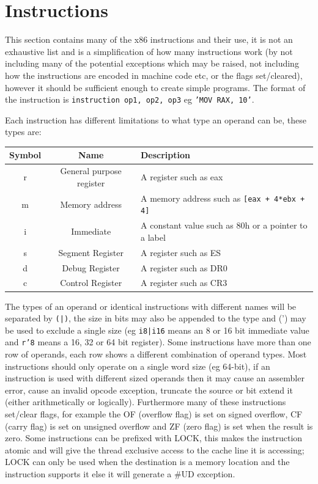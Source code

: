 \documentclass{article}
\newcommand{\layout}[1]{\parbox{\linewidth}{#1}}
\begin{document}
\layout{
  \section{Instructions}

  This section contains many of the x86 instructions and their use, it is not an exhaustive list and is a simplification of how many instructions work (by not including many of the potential exceptions which may be raised, not including how the instructions are encoded in machine code etc, or the flags set/cleared), however it should be sufficient enough to create simple programs.
  The format of the instruction is \texttt{instruction op1, op2, op3} eg \texttt{'MOV RAX, 10'}.
} \bigskip

\layout{
  Each instruction has different limitations to what type an operand can be, these types are:
  \begin{table}[H]
    \centering
    \begin{tabular}{|c|c|l|}
      \hline \textbf{Symbol} & \textbf{Name} & \textbf{Description} \\ \hline
      r & General purpose register & A register such as eax \\
      m & Memory address & A memory address such as \texttt{[eax + 4*ebx + 4]} \\
      i & Immediate & A constant value such as 80h or a pointer to a label \\
      s & Segment Register & A register such as ES \\
      d & Debug Register & A register such as DR0 \\
      c & Control Register & A register such as CR3 \\ \hline
    \end{tabular}
  \end{table}
}

\layout{
  The types of an operand or identical instructions with different names will be separated by \texttt{(|)}, the size in bits may also be appended to the type and (') may be used to exclude a single size (eg \texttt{i8|i16} means an 8 or 16 bit immediate value and \texttt{r'8} means a 16, 32 or 64 bit register).
  Some instructions have more than one row of operands, each row shows a different combination of operand types. Most instructions should only operate on a single word size (eg 64-bit), if an instruction is used with different sized operands then it may cause an assembler error, cause an invalid opcode exception, truncate the source or bit extend it (either arithmetically or logically).
  Furthermore many of these instructions set/clear flags, for example the OF (overflow flag) is set on signed overflow, CF (carry flag) is set on unsigned overflow and ZF (zero flag) is set when the result is zero.
  Some instructions can be prefixed with LOCK, this makes the instruction atomic and will give the thread exclusive access to the cache line it is accessing; LOCK can only be used when the destination is a memory location and the instruction supports it else it will generate a \#UD exception.
}
\end{document}
